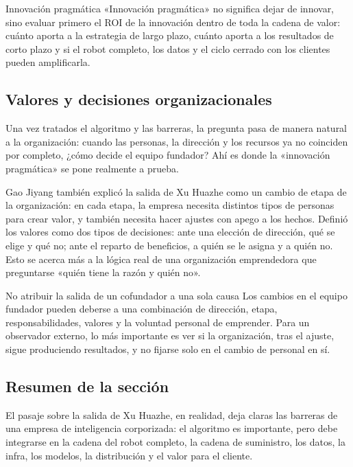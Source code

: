 \documentclass[a4paper]{article}
\begin{document}
\begin{importantbox}{Innovación pragmática}
«Innovación pragmática» no significa dejar de innovar, sino evaluar primero el ROI de la innovación dentro de toda la cadena de valor: cuánto aporta a la estrategia de largo plazo, cuánto aporta a los resultados de corto plazo y si el robot completo, los datos y el ciclo cerrado con los clientes pueden amplificarla.
\end{importantbox}

\subsection{Valores y decisiones organizacionales}

Una vez tratados el algoritmo y las barreras, la pregunta pasa de manera natural a la organización: cuando las personas, la dirección y los recursos ya no coinciden por completo, ¿cómo decide el equipo fundador? Ahí es donde la «innovación pragmática» se pone realmente a prueba.

Gao Jiyang también explicó la salida de Xu Huazhe como un cambio de etapa de la organización: en cada etapa, la empresa necesita distintos tipos de personas para crear valor, y también necesita hacer ajustes con apego a los hechos. Definió los valores como dos tipos de decisiones: ante una elección de dirección, qué se elige y qué no; ante el reparto de beneficios, a quién se le asigna y a quién no. Esto se acerca más a la lógica real de una organización emprendedora que preguntarse «quién tiene la razón y quién no».

\begin{warningbox}{No atribuir la salida de un cofundador a una sola causa}
Los cambios en el equipo fundador pueden deberse a una combinación de dirección, etapa, responsabilidades, valores y la voluntad personal de emprender. Para un observador externo, lo más importante es ver si la organización, tras el ajuste, sigue produciendo resultados, y no fijarse solo en el cambio de personal en sí.
\end{warningbox}

\subsection{Resumen de la sección}

El pasaje sobre la salida de Xu Huazhe, en realidad, deja claras las barreras de una empresa de inteligencia corporizada: el algoritmo es importante, pero debe integrarse en la cadena del robot completo, la cadena de suministro, los datos, la infra, los modelos, la distribución y el valor para el cliente.
\end{document}
